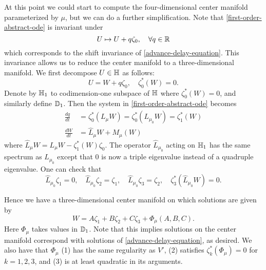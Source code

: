 At this point we could start to compute the four-dimensional center manifold parameterized by \(\mu\), but we can do a further simplification. Note that \cref{first-order-abstract-ode} is invariant under 
\begin{equation}
	U \mapsto U + q \zeta_0, \quad \forall q \in \mathbb{R}
\end{equation}
which corresponds to the shift invariance of \cref{advance-delay-equation}. This invariance allows us to reduce the center manifold to a three-dimensional manifold. We first decompose \(U \in \mathbb{H}\) as follows:
\begin{equation}
	U = W + q \zeta_0, \quad \zeta_0^*(W) = 0.
\end{equation}
Denote by \(\mathbb{H}_1\) to codimension-one subspace of \(\mathbb{H}\) where \(\zeta_0^*(W) = 0\), and similarly define \(\mathbb{D}_1\). Then the system in \cref{first-order-abstract-ode} becomes
\begin{align}
	\frac{dq}{dt} &= \zeta_0^*(L_{\mu} W) = \zeta_0^*(L_{\mu_0} W) = \zeta_1^*(W) \\
	\frac{d W}{dt} &= \widehat{L}_\mu W + M_\mu(W) \label{reduced-first-order-system}
\end{align}
where \(\widehat{L}_\mu W = L_\mu W - \zeta_1^*(W)\zeta_0\). The operator \(\widehat L_{\mu_0}\) acting on \(\mathbb{H}_1\) has the same spectrum as \(L_{\mu_0}\) except that \(0\) is now a triple eigenvalue instead of a quadruple eigenvalue. One can check that
\begin{equation}\label{reduced-eigenfunction}
	\widehat{L}_{\mu_0} \zeta_1 = 0, \quad \widehat{L}_{\mu_0}\zeta_2 = \zeta_1, \quad \widehat{L}_{\mu_0}\zeta_3 = \zeta_2, \quad \zeta_3^*(\widehat{L}_{\mu_0}W) = 0.
\end{equation}

Hence we have a three-dimensional center manifold on which solutions are given by
\begin{equation}\label{W-center-manifold}
	W = A \zeta_1 + B\zeta_2 + C\zeta_3 +\Phi_\mu(A,B,C).
\end{equation}
Here \(\Phi_\mu\) takes values in \(\mathbb{D}_1\). Note that this implies solutions on the center manifold correspond with solutions of \cref{advance-delay-equation}, as desired. We also have that \(\Phi_\mu\) (1) has the same regularity as \(V'\), (2) satisfies \(\zeta_k^*(\Phi_\mu) = 0\) for \(k=1,2,3\),  and (3) is at least quadratic in its arguments.

